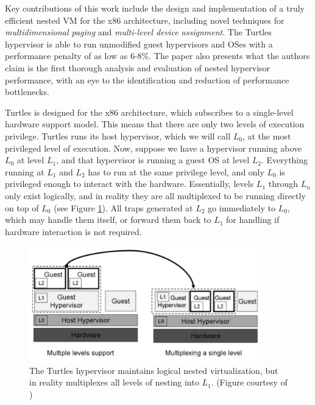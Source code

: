 \documentclass[letterpaper, twocolumn]{article}
\begin{document}
Key contributions of this work include the design and implementation
of a truly efficient nested VM for the x86 architecture, including novel
techniques for \emph{multidimensional paging} and
\emph{multi-level device assignment}.  The Turtles hypervisor is able to
run unmodified guest hypervisors and OSes with a performance penalty of
as low as 6-8\%.  The paper also presents what the authors claim is the
first thorough analysis and evaluation of nested hypervisor performance,
with an eye to the identification and reduction of performance bottlenecks.

Turtles is designed for the x86 architecture, which subscribes to a
single-level hardware support model.  This means that there are only two
levels of execution privilege.  Turtles runs its host hypervisor, which
we will call $L_0$, at the most privileged level of execution.  Now, suppose
we have a hypervisor running above $L_0$ at level $L_1$, and that hypervisor
is running a guest OS at level $L_2$.  Everything running at $L_1$ and $L_2$
has to run at the same privilege level, and only $L_0$ is privileged enough
to interact with the hardware.  Essentially, levels $L_1$ through $L_n$ only
exist logically, and in reality they are all multiplexed to be running directly
on top of $L_0$ (see Figure \ref{fig:turtles-multiplex}).  All traps generated at
$L_2$ go immediately to $L_0$, which
may handle them itself, or forward them back to $L_1$ for handling if hardware
interaction is not required.

\begin{figure}[t]
	\begin{center}
		\includegraphics[width=4in]{images/turtles.png}
	\end{center}
	\caption{The Turtles hypervisor maintains logical nested virtualization, but
		in reality multiplexes all levels of nesting into $L_1$. (Figure courtesy
		of \cite{ref:turtles})}
	\label{fig:turtles-multiplex}
\end{figure}
\end{document}

